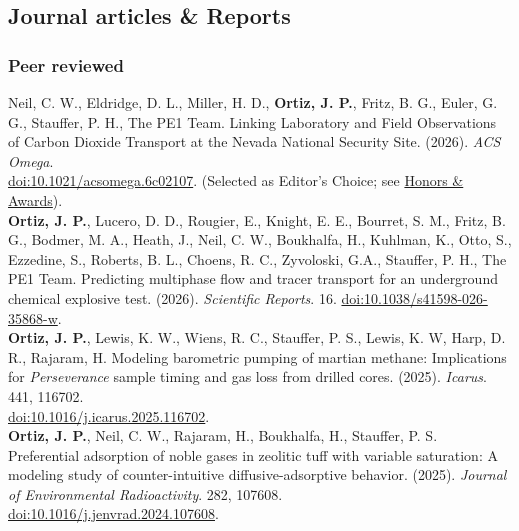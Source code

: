 \documentclass[11pt, letterpaper]{article}
\newcommand{\years}[1]{\marginnote{\scriptsize #1}}
\begin{document}
\subsection*{Journal articles \& Reports}

\subsubsection*{Peer reviewed}

\noindent
\hypersetup{linkcolor=black,citecolor=blue,filecolor=black,urlcolor=black} 
%
 \years{2026}Neil, C. W., Eldridge, D. L., Miller, H. D., \textbf{Ortiz, J.
 P.}, Fritz, B. G., Euler, G. G., Stauffer, P. H., The PE1 Team.  Linking
 Laboratory and Field Observations of Carbon Dioxide Transport at the Nevada
 National Security Site.  (2026). \emph{ACS Omega}.\\ 
 \href{https://doi.org/10.1021/acsomega.6c02107}{doi:10.1021/acsomega.6c02107}. 
 (Selected as Editor's Choice; see \hyperref[sec:awards]{Honors \& Awards}).
 \ACSOmegaOOOOLinkingLaboratoryand\\
%
\years{2026}\textbf{Ortiz, J. P.}, Lucero, D. D.,  Rougier, E., Knight, E. E.,
Bourret, S. M., Fritz, B.  G., Bodmer, M. A., Heath, J., Neil, C. W.,
Boukhalfa, H., Kuhlman, K., Otto, S., Ezzedine, S., Roberts, B. L., Choens, R.
C., Zyvoloski, G.A., Stauffer, P. H., The PE1 Team. 
 Predicting multiphase flow and tracer transport for an underground chemical
 explosive test. (2026). 
 \emph{Scientific Reports}. 16.
 \href{https://doi.org/10.1038/s41598-026-35868-w}{doi:10.1038/s41598-026-35868-w}.
\ScientificReportsOOOOPredictingmultiphase \\
%
\years{2025}\textbf{Ortiz, J. P.}, Lewis, K. W., Wiens, R. C., Stauffer, P.
S., Lewis, K. W, Harp, D. R., Rajaram, H.  Modeling barometric pumping of
martian methane: Implications for \textit{Perseverance} sample timing and gas
loss from drilled cores. (2025).  \emph{Icarus}. 441, 116702.\\
\href{https://doi.org/10.1016/j.icarus.2025.116702}{doi:10.1016/j.icarus.2025.116702}.
\IcarusOOOOModelingbarometricpu \\
%
\years{2025}\textbf{Ortiz, J. P.}, Neil, C. W., Rajaram, H., Boukhalfa, H.,
Stauffer, P. S.  Preferential adsorption of noble gases in zeolitic tuff with
variable saturation: A modeling study of counter-intuitive diffusive-adsorptive
behavior. (2025).  \emph{Journal of Environmental
Radioactivity}. 282, 107608.\\
\href{https://doi.org/10.1016/j.jenvrad.2024.107608}{doi:10.1016/j.jenvrad.2024.107608}.
\end{document}
